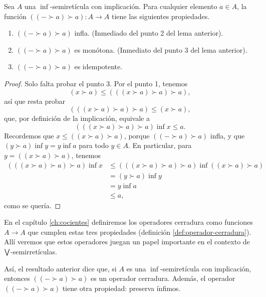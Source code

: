 \begin{lemma}
  \label{lemma:w-cerradura}
  Sea $A$ una $\inf$-semiretícula con implicación.
  Para cualquier elemento $a\in A$, la función
  $((-\succ a)\succ a):A\to A$ tiene las siguientes propiedades.
  \begin{enumerate}
    \item $((-\succ a)\succ a)$ infla.
    (Inmediado del punto 2 del lema anterior).
    \item $((-\succ a)\succ a)$ es monótona.
      (Inmediato del punto 3 del lema anterior).
    \item $((-\succ a)\succ a)$ es idempotente.
  \end{enumerate}
\end{lemma}
\begin{proof}
  Solo falta probar el punto 3.
  Por el punto 1, tenemos
  \[
    (x\succ a) \leq (((x\succ a)\succ a)\succ a),
  \]
  así que resta probar
  \[
     (((x\succ a)\succ a)\succ a) \leq (x\succ a),
  \]
  que, por definición de la implicación, equivale a
  \[
     (((x\succ a)\succ a)\succ a) \inf x \leq a.
  \]
  Recordemos que $x\leq ((x\succ a)\succ a)$, porque $((-\succ
  a)\succ a)$ infla, y que
  $(y\succ a)\inf y = y\inf a$ para todo $y\in A$.
  En particular, para $y=((x\succ a)\succ a)$, tenemos
  \begin{align*}
     (((x\succ a)\succ a)\succ a) \inf x
     &\leq (((x\succ a)\succ a)\succ a)
       \inf ((x\succ a)\succ a) \\
     &= (y\succ a) \inf y \\
     &= y \inf a \\
     &\leq a,
  \end{align*}
  como se quería. 
\end{proof}

En el capítulo \ref{ch:cocientes} definiremos los operadores
cerradura como funciones $A\to A$ que cumplen estas tres
propiedades (definición \ref{def:operador-cerradura}).
Allí veremos que estos operadores juegan un papel
importante en el contexto de $\bigvee$-semirretículas.

Así, el resultado anterior dice que, si $A$ es una
$\inf$-semiretícula con implicación,
entonces $((-\succ a)\succ a)$ es un operador cerradura.
Además, el operador $((-\succ a)\succ a)$ tiene otra propiedad:
preserva ínfimos.

